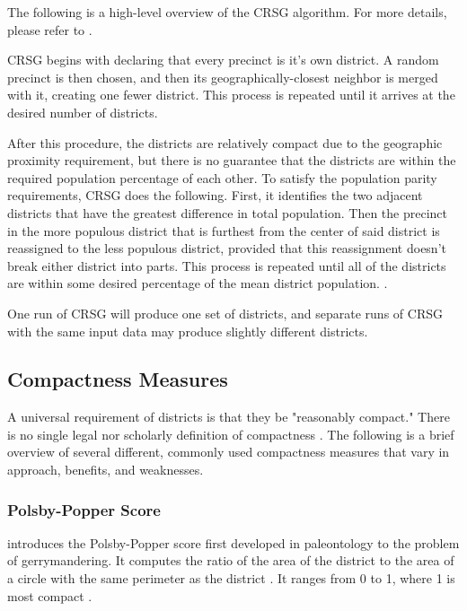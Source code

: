 The following is a high-level overview of the CRSG algorithm. For more details, please refer to \textcite[249-50]{chen2013}.

CRSG begins with declaring that every precinct is it's own district. A random precinct is then chosen, and then its geographically-closest neighbor is merged with it, creating one fewer district. This process is repeated until it arrives at the desired number of districts. \parencite[249-50]{chen2013}

After this procedure, the districts are relatively compact due to the geographic proximity requirement, but there is no guarantee that the districts are within the required population percentage of each other. To satisfy the population parity requirements, CRSG does the following. First, it identifies the two adjacent districts that have the greatest difference in total population. Then the precinct in the more populous district that is furthest from the center of said district is reassigned to the less populous district, provided that this reassignment doesn't break either district into parts. This process is repeated until all of the districts are within some desired percentage of the mean district population. \parencite[249-50]{chen2013}.

One run of CRSG will produce one set of districts, and separate runs of CRSG with the same input data may produce slightly different districts.

\subsection{Compactness Measures}

A universal requirement of districts is that they be "reasonably compact." There is no single legal nor scholarly definition of compactness \parencite{katz2020}. The following is a brief overview of several different, commonly used compactness measures that vary in approach, benefits, and weaknesses.

\subsubsection{Polsby-Popper Score}
\label{sec:polsbypopper}

\textcite{polsby1991} introduces the Polsby-Popper score first developed in paleontology to the problem of gerrymandering. It computes the ratio of the area of the district to the area of a circle with the same perimeter as the district \parencite{cox1927,polsby1991}. It ranges from 0 to 1, where 1 is most compact \parencite{polsby1991}.

